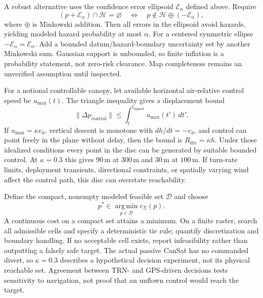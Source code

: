 \documentclass[11pt,a4paper]{article}
\numberwithin{equation}{section}
\begin{document}
A robust alternative uses the confidence error ellipsoid
$\mathcal E_\alpha$ defined above. Require
\begin{equation}
 (p+\mathcal E_\alpha)\cap\mathcal H=\varnothing
 \quad\Longleftrightarrow\quad
 p\notin\mathcal H\oplus(-\mathcal E_\alpha),
\end{equation}
where $\oplus$ is Minkowski addition. Then all errors in the ellipsoid
avoid hazards, yielding modeled hazard probability at most $\alpha$.
For a centered symmetric ellipse $-\mathcal E_\alpha=\mathcal E_\alpha$.
Add a bounded datum/hazard-boundary uncertainty set by another Minkowski
sum. Gaussian support is unbounded, so finite inflation is a probability
statement, not zero-risk clearance. Map completeness remains an
unverified assumption until inspected.

For a notional controllable canopy, let available horizontal
air-relative control speed be $u_{\max}(t)$. The triangle inequality
gives a displacement bound
\begin{equation}
 \|\Delta p_{\mathrm{control}}\|
 \leq\int_t^{t_{\mathrm{impact}}}u_{\max}(t')\,dt'.
\end{equation}
If $u_{\max}=\kappa v_d$, vertical descent is monotone with
$dh/dt=-v_d$, and control can point freely in the plane without delay,
then the bound is $R_{\mathrm{div}}=\kappa h$. Under those idealized
conditions every point in the disc can be generated by suitable bounded
control. At $\kappa=0.3$ this gives $90\,\mathrm m$ at $300\,\mathrm m$
and $30\,\mathrm m$ at $100\,\mathrm m$. If turn-rate limits,
deployment transients, directional constraints, or spatially varying
wind affect the control path, this disc can overstate reachability.

Define the compact, nonempty modeled feasible set $\mathcal D$ and choose
\begin{equation}
 p^*\in\operatorname*{arg\,min}_{p\in\mathcal D}c_\Sigma(p).
\end{equation}
A continuous cost on a compact set attains a minimum. On a finite
raster, search all admissible cells and specify a deterministic tie
rule; quantify discretization and boundary handling. If no acceptable
cell exists, report infeasibility rather than outputting a falsely
safe target. The actual passive CanSat has no commanded divert, so
$\kappa=0.3$ describes a hypothetical decision experiment, not its
physical reachable set. Agreement between TRN- and GPS-driven decisions
tests sensitivity to navigation, not proof that an unflown control
would reach the target.
\end{document}
